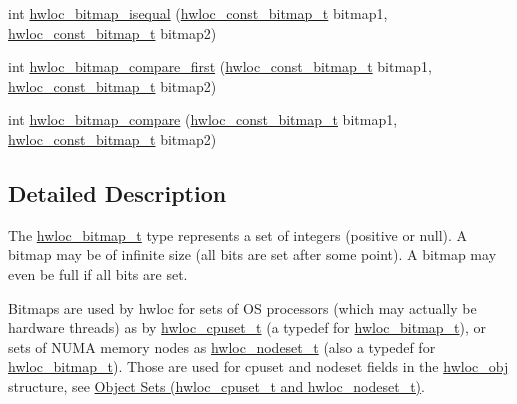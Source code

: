 \begin{DoxyCompactItemize}
$$\item 
int \hyperlink{a00205_ga32376b1405e57472b73c3aa53bb39663}{hwloc\+\_\+bitmap\+\_\+isequal} (\hyperlink{a00205_gae991a108af01d408be2776c5b2c467b2}{hwloc\+\_\+const\+\_\+bitmap\+\_\+t} bitmap1, \hyperlink{a00205_gae991a108af01d408be2776c5b2c467b2}{hwloc\+\_\+const\+\_\+bitmap\+\_\+t} bitmap2)
\item 
int \hyperlink{a00205_gaa39cda1510ab721b5c012c76ead72365}{hwloc\+\_\+bitmap\+\_\+compare\+\_\+first} (\hyperlink{a00205_gae991a108af01d408be2776c5b2c467b2}{hwloc\+\_\+const\+\_\+bitmap\+\_\+t} bitmap1, \hyperlink{a00205_gae991a108af01d408be2776c5b2c467b2}{hwloc\+\_\+const\+\_\+bitmap\+\_\+t} bitmap2)
\item 
int \hyperlink{a00205_ga14cdbc0ef0a705e84999bd48a2e649f3}{hwloc\+\_\+bitmap\+\_\+compare} (\hyperlink{a00205_gae991a108af01d408be2776c5b2c467b2}{hwloc\+\_\+const\+\_\+bitmap\+\_\+t} bitmap1, \hyperlink{a00205_gae991a108af01d408be2776c5b2c467b2}{hwloc\+\_\+const\+\_\+bitmap\+\_\+t} bitmap2)
\end{DoxyCompactItemize}


\subsection{Detailed Description}
The \hyperlink{a00205_gaa3c2bf4c776d603dcebbb61b0c923d84}{hwloc\+\_\+bitmap\+\_\+t} type represents a set of integers (positive or null). A bitmap may be of infinite size (all bits are set after some point). A bitmap may even be full if all bits are set.

Bitmaps are used by hwloc for sets of OS processors (which may actually be hardware threads) as by \hyperlink{a00183_ga4bbf39b68b6f568fb92739e7c0ea7801}{hwloc\+\_\+cpuset\+\_\+t} (a typedef for \hyperlink{a00205_gaa3c2bf4c776d603dcebbb61b0c923d84}{hwloc\+\_\+bitmap\+\_\+t}), or sets of N\+U\+MA memory nodes as \hyperlink{a00183_ga37e35730fa7e775b5bb0afe893d6d508}{hwloc\+\_\+nodeset\+\_\+t} (also a typedef for \hyperlink{a00205_gaa3c2bf4c776d603dcebbb61b0c923d84}{hwloc\+\_\+bitmap\+\_\+t}). Those are used for cpuset and nodeset fields in the \hyperlink{a00238}{hwloc\+\_\+obj} structure, see \hyperlink{a00183}{Object Sets (hwloc\+\_\+cpuset\+\_\+t and hwloc\+\_\+nodeset\+\_\+t)}.

